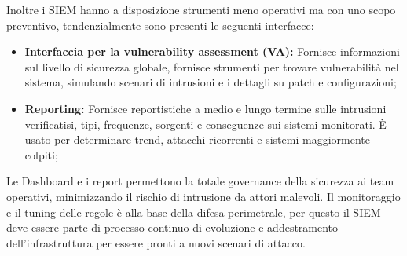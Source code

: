 Inoltre i SIEM hanno a disposizione strumenti meno operativi ma con uno scopo preventivo, tendenzialmente sono presenti le seguenti interfacce:

\begin{itemize}
    \item\textbf{Interfaccia per la vulnerability assessment (VA):} Fornisce informazioni sul livello di sicurezza globale, fornisce strumenti per trovare vulnerabilità nel sistema, simulando scenari di intrusioni e i dettagli su patch e configurazioni;
    \item\textbf{Reporting:} Fornisce reportistiche a medio e lungo termine sulle intrusioni verificatisi, tipi, frequenze, sorgenti e conseguenze sui sistemi monitorati. È usato per determinare trend, attacchi ricorrenti e sistemi maggiormente colpiti;
\end{itemize}

Le Dashboard e i report permettono la totale governance della sicurezza ai team operativi, minimizzando il rischio di intrusione da attori malevoli.
Il monitoraggio e il tuning delle regole è alla base della difesa perimetrale, per questo il SIEM deve essere parte di processo continuo di evoluzione e addestramento dell’infrastruttura per essere pronti a nuovi scenari di attacco.


